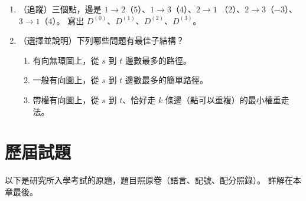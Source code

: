 \begin{enumerate}
\item \label{dp-q-fw}（追蹤）三個點，邊是 $1 \to 2$（$5$）、$1 \to 3$（$4$）、$2 \to 1$
（$2$）、$2 \to 3$（$-3$）、$3 \to 1$（$4$）。 寫出 $D^{(0)}$、$D^{(1)}$、$D^{(2)}$、$D^{(3)}$。

\item \label{dp-q-sub}（選擇並說明）下列哪些問題有最佳子結構？
\begin{enumerate}
\item 有向無環圖上，從 $s$ 到 $t$ 邊數最多的路徑。
\item 一般有向圖上，從 $s$ 到 $t$ 邊數最多的簡單路徑。
\item 帶權有向圖上，從 $s$ 到 $t$、恰好走 $k$ 條邊（點可以重複）的最小權重走法。
\end{enumerate}
\end{enumerate}

\section{歷屆試題}
\label{sec:dp-pastexam}

以下是研究所入學考試的原題，題目照原卷（語言、記號、配分照錄）。 詳解在本章最後。

